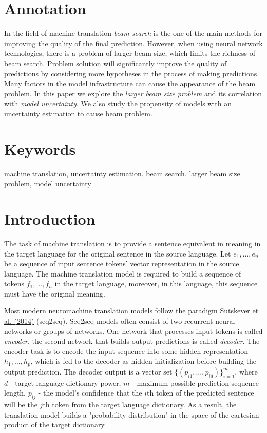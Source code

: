 \documentclass[a4paper,14pt]{extarticle}
\newcommand{\bibref}[3]{\hyperlink{#1}{#2 (#3)}}
\begin{document}
	\newpage

	{
		\hypersetup{linkcolor=black}
		\tableofcontents
	}

	\newpage
	
	\section{Annotation}
	In the field of machine translation \textit{beam search} is the one of the main methods for improving the quality of the final prediction. However, when using neural network technologies, there is a problem of larger beam size, which limits the richness of beam search. Problem solution will significantly improve the quality of predictions by considering more hypotheses in the process of making predictions. Many factors in the model infrastructure can cause the appearance of the beam problem. In this paper we explore the \textit{larger beam size problem} and its correlation with \textit{model uncertainty}. We also study the propensity of models with an uncertainty estimation to cause beam problem.
	
	\section{Keywords}
		machine translation, uncertainty estimation, beam search, larger beam size problem, model uncertainty
		
	\section{Introduction}
	The task of machine translation is to provide a sentence equivalent in meaning in the target language for the original sentence in the source language. Let $e_1, \dots, e_n$ be a sequence of input sentence tokens' vector representation in the source language. The machine translation model is required to build a sequence of tokens $f_1, \dots, f_n$ in the target language, moreover, in this language, this sequence must have the original meaning.
	
	Most modern neuromachine translation models follow the paradigm \bibref{seq2seq}{Sutskever et al.}{2014} (seq2seq). Seq2seq models often consist of two recurrent neural networks or groups of networks. One network that processes input tokens is called \textit{encoder}, the second network that builds output predictions is called \textit{decoder}. The encoder task is to encode the input sequence into some hidden representation $h_1, \dots, h_p$, which is fed to the decoder as hidden initialization before building the output prediction. The decoder output is a vector set $\{(p_{i1}, \dots, p_{id})\}_{i=1}^{m}$, where $d$ - target language dictionary power, $m$ - maximum possible prediction sequence length, $p_{ij}$ - the model's confidence that the $i$th token of the predicted sentence will be the $j$th token from the target language dictionary. As a result, the translation model builds a "probability distribution" in the space of the cartesian product of the target dictionary.
\end{document}
